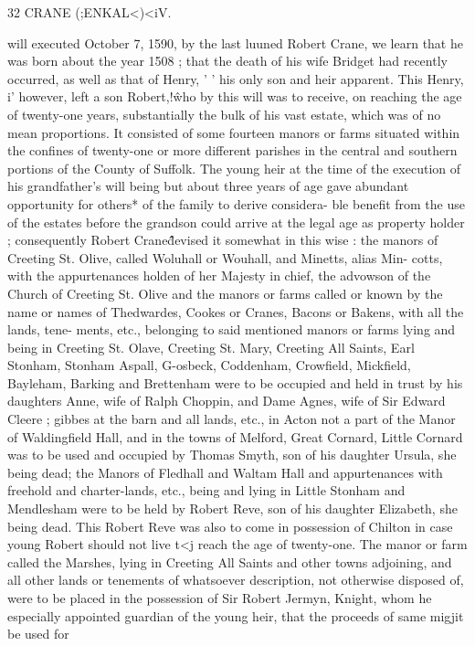 32 CRANE (;ENKAL<)<iV. 

will executed October 7, 1590, by the last luuned Robert Crane, 
we learn that he was born about the year 1508 ; that the death of 
his wife Bridget had recently occurred, as well as that of Henry, ' ' 
his only son and heir apparent. This Henry, i' however, left a 
son Robert,!\^ who by this will was to receive, on reaching the age 
of twenty-one years, substantially the bulk of his vast estate, 
which was of no mean proportions. It consisted of some fourteen 
manors or farms situated within the confines of twenty-one or 
more different parishes in the central and southern portions of the 
County of Suffolk. The young heir at the time of the execution 
of his grandfather's will being but about three years of age gave 
abundant opportunity for others* of the family to derive considera- 
ble benefit from the use of the estates before the grandson could 
arrive at the legal age as property holder ; consequently Robert 
Crane\^\^ devised it somewhat in this wise : the manors of Creeting 
St. Olive, called Woluhall or Wouhall, and Minetts, alias Min- 
cotts, with the appurtenances holden of her Majesty in chief, the 
advowson of the Church of Creeting St. Olive and the manors or 
farms called or known by the name or names of Thedwardes, 
Cookes or Cranes, Bacons or Bakens, with all the lands, tene- 
ments, etc., belonging to said mentioned manors or farms lying 
and being in Creeting St. Olave, Creeting St. Mary, Creeting All 
Saints, Earl Stonham, Stonham Aspall, G-osbeck, Coddenham, 
Crowfield, Mickfield, Bayleham, Barking and Brettenham were to 
be occupied and held in trust by his daughters Anne, wife of 
Ralph Choppin, and Dame Agnes, wife of Sir Edward Cleere ; 
gibbes at the barn and all lands, etc., in Acton not a part of the 
Manor of Waldingfield Hall, and in the towns of Melford, Great 
Cornard, Little Cornard was to be used and occupied by Thomas 
Smyth, son of his daughter Ursula, she being dead; the Manors 
of Fledhall and Waltam Hall and appurtenances with freehold 
and charter-lands, etc., being and lying in Little Stonham and 
Mendlesham were to be held by Robert Reve, son of his daughter 
Elizabeth, she being dead. This Robert Reve was also to come 
in possession of Chilton in case young Robert should not live t<j 
reach the age of twenty-one. The manor or farm called the 
Marshes, lying in Creeting All Saints and other towns adjoining, 
and all other lands or tenements of whatsoever description, not 
otherwise disposed of, were to be placed in the possession of Sir 
Robert Jermyn, Knight, whom he especially appointed guardian 
of the young heir, that the proceeds of same migjit be used for 



